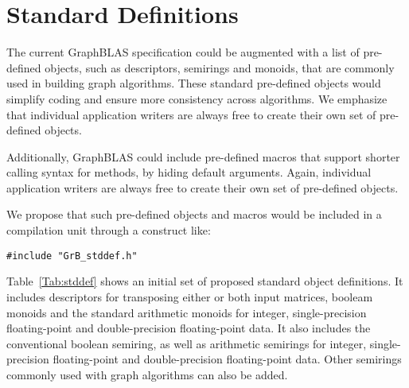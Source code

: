 \section{Standard Definitions}
\label{Sec:stddef}

\newcommand{\integer}{{\sf int32\_t}}
\newcommand{\float}{{\sf float}}
\newcommand{\double}{{\sf double}}
\newcommand{\bool}{{\sf bool}}
\newcommand{\false}{{\sf false}}
\newcommand{\true}{{\sf true}}

The current GraphBLAS specification could be augmented with a list of 
pre-defined objects, such as descriptors, semirings and monoids, that are commonly used
in building graph algorithms. These standard pre-defined objects would
simplify coding and ensure more consistency across algorithms. 
We emphasize
that individual application writers are always free to create their own set of
pre-defined objects.

Additionally, GraphBLAS could include pre-defined macros that support
shorter calling syntax for methods, by hiding default arguments. 
Again, individual application writers are always free to create their
own set of pre-defined objects.

We propose that such pre-defined objects and macros would
be included in a compilation unit through a construct like:

\begin{verbatim}
#include "GrB_stddef.h"
\end{verbatim}

Table~\ref{Tab:stddef} shows an initial set of proposed standard object
definitions.  It includes descriptors for transposing either or both input
matrices, booleam monoids and the standard arithmetic monoids for integer,
single-precision floating-point and double-precision floating-point
data.  It also includes the conventional boolean semiring, as well as
arithmetic semirings for integer, single-precision floating-point and
double-precision floating-point data.  Other semirings commonly used
with graph algorithms can also be added.

